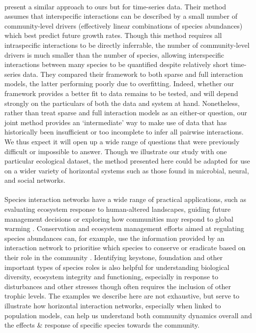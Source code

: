 \documentclass[a4,12pt]{article}
\begin{document}
\begin{refsection}
    \paragraph{}
    \textcite{Ovaskainen2017} present a similar approach to ours but for time-series data. Their method assumes that interspecific interactions can be described by a small number of community-level drivers (effectively linear combinations of species abundances) which best predict future growth rates. Though this method requires all intraspecific interactions to be directly inferrable, the number of community-level drivers is much smaller than the number of species, allowing interspecific interactions between many species to be quantified despite relatively short time-series data. They compared their framework to both sparse and full interaction models, the latter performing poorly due to overfitting. Indeed, whether our framework provides a better fit to data remains to be tested, and will depend strongly on the particulars of both the data and system at hand. Nonetheless, rather than treat sparse and full interaction models as an either-or question, our joint method provides an `intermediate' way to make use of data that has historically been insufficient or too incomplete to infer all pairwise interactions. We thus expect it will open up a wide range of questions that were previously difficult or impossible to answer. Though we illustrate our study with one particular ecological dataset, the method presented here could be adapted for use on a wider variety of horizontal systems such as those found in microbial, neural, and social networks. 

    \paragraph{}
    Species interaction networks have a wide range of practical applications, such as evaluating ecosystem response to human-altered landscapes, guiding future management decisions \parencite{Ross2011} or exploring how communities may respond to global warming \parencite{Gorman2019}. Conservation and ecosystem management efforts aimed at regulating species abundances can, for example, use the information provided by an interaction network to prioritise which species to conserve or eradicate based on their role in the community \parencite{Cirtwill2018a}. Identifying keystone, foundation and other important types of species roles is also helpful for understanding biological diversity, ecosystem integrity and functioning, especially in response to disturbances and other stresses \parencite{Nyakatya2008, Orwin2016, Losapio2017, Narwani2019} though often requires the inclusion of other trophic levels. The examples we describe here are not exhaustive, but serve to illustrate how horizontal interaction networks, especially when linked to population models, can help us understand both community dynamics overall and the effects \& response of specific species towards the community. 


\end{refsection}
\end{document}
